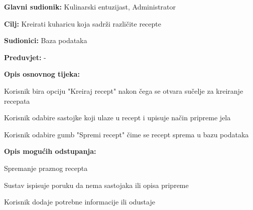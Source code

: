					\noindent {}
					\begin{packed_item}
	
						\item \textbf{Glavni sudionik: } Kulinarski entuzijast, Administrator 
						\item  \textbf{Cilj:} Kreirati kuharicu koja sadrži različite recepte
						\item  \textbf{Sudionici:} Baza podataka
						\item  \textbf{Preduvjet:} -
						\item  \textbf{Opis osnovnog tijeka:} 
						
						\item[] \begin{packed_enum}
	
						\item Korisnik bira opciju "Kreiraj recept" nakon čega se otvara sučelje za kreiranje recepata
						\item Korisnik odabire sastojke koji ulaze u recept i upisuje način pripreme jela
						\item Korisnik odabire gumb "Spremi recept" čime se recept sprema u bazu podataka
						\end{packed_enum}
						
						\item  \textbf{Opis mogućih odstupanja:}
						
						\item[] \begin{packed_item}
	
							\item[2.a] Spremanje praznog recepta
							\item[] \begin{packed_enum}
								
								\item Sustav ispisuje poruku da nema sastojaka ili opisa pripreme
								\item Korisnik dodaje potrebne informacije ili odustaje
								
							\end{packed_enum}							


						\end{packed_item}
					\end{packed_item}


